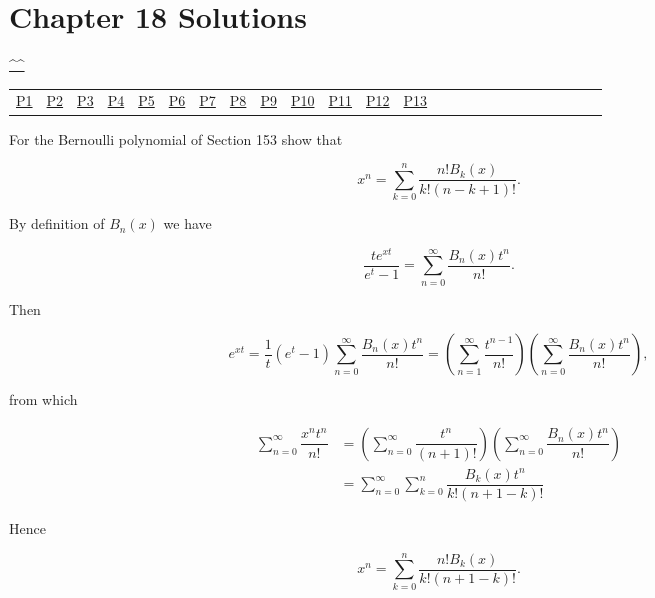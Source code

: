\section{Chapter 18 Solutions}
\begin{center}\hyperref[toc]{\^{}\^{}}\end{center}
\begin{center}\begin{tabular}{lllllllllllllllllllllllll}
\hyperref[problem1chapter18]{P1} & \hyperref[problem2chapter18]{P2} & \hyperref[problem3chapter18]{P3} & \hyperref[problem4chapter18]{P4} & \hyperref[problem5chapter18]{P5} & \hyperref[problem6chapter18]{P6} & \hyperref[problem7chapter18]{P7} & \hyperref[problem8chapter18]{P8} & \hyperref[problem9chapter18]{P9} & \hyperref[problem10chapter18]{P10} & \hyperref[problem11chapter18]{P11} & \hyperref[problem12chapter18]{P12} & \hyperref[problem13chapter18]{P13} 
\end{tabular}\end{center}
\setcounter{problem}{0}
\setcounter{solution}{0}
\begin{problem}\label{problem1chapter18}
For the Bernoulli polynomial of Section 153 show that

$$x^n = \displaystyle\sum_{k=0}^n \dfrac{n! B_k(x)}{k! (n-k+1)!}.$$
\end{problem}
\begin{solution}
By definition of $B_n(x)$ we have

$$\dfrac{te^{xt}}{e^t-1} = \displaystyle\sum_{n=0}^{\infty} \dfrac{B_n(x) t^n}{n!}.$$

Then

$$e^{xt} = \dfrac{1}{t} (e^t-1) \displaystyle\sum_{n=0}^{\infty} \dfrac{B_n(x)t^n}{n!} = \left( \displaystyle\sum_{n=1}^{\infty} \dfrac{t^{n-1}}{n!} \right) \left( \displaystyle\sum_{n=0}^{\infty} \dfrac{B_n(x) t^n}{n!} \right),$$

from which

$$\begin{array}{ll}
\displaystyle\sum_{n=0}^{\infty} \dfrac{x^n t^n}{n!} &= \left( \displaystyle\sum_{n=0}^{\infty} \dfrac{t^n}{(n+1)!} \right) \left( \displaystyle\sum_{n=0}^{\infty} \dfrac{B_n(x)t^n}{n!} \right) \\
&= \displaystyle\sum_{n=0}^{\infty} \displaystyle\sum_{k=0}^n \dfrac{B_k(x) t^n}{k!( n+1-k)!}
\end{array}$$

Hence

$$x^n = \displaystyle\sum_{k=0}^n \dfrac{n! B_k(x) }{k!(n+1-k)!}.$$
\end{solution}
